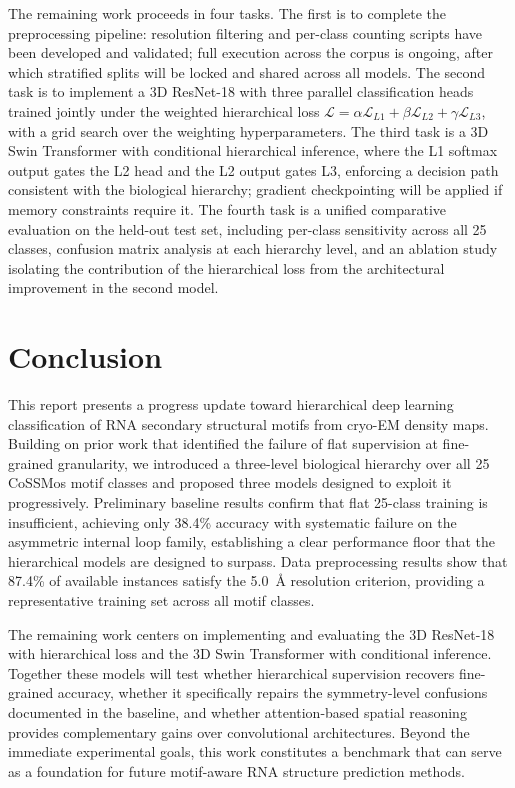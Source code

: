 \documentclass[sigconf]{acmart}
\begin{document}
The remaining work proceeds in four tasks. The first is to complete
the preprocessing pipeline: resolution filtering and per-class
counting scripts have been developed and validated; full execution
across the corpus is ongoing, after which stratified splits will
be locked and shared across all models. The second task is to
implement a 3D ResNet-18 with three parallel
classification heads trained jointly under the weighted hierarchical
loss $\mathcal{L} = \alpha\mathcal{L}_{L1} + \beta\mathcal{L}_{L2}
+ \gamma\mathcal{L}_{L3}$, with a grid search over the weighting
hyperparameters. The third task is a 3D Swin Transformer
\cite{swin2021} with conditional hierarchical inference, where the
L1 softmax output gates the L2 head and the L2 output gates L3,
enforcing a decision path consistent with the biological hierarchy;
gradient checkpointing will be applied if memory constraints
require it. The fourth task is a unified comparative evaluation
on the held-out test set, including per-class sensitivity across
all 25 classes, confusion matrix analysis at each hierarchy
level, and an ablation study isolating the contribution of the
hierarchical loss from the architectural improvement in the second model.

\section{Conclusion}

This report presents a progress update toward hierarchical deep
learning classification of RNA secondary structural motifs from
cryo-EM density maps. Building on prior work that identified the
failure of flat supervision at fine-grained granularity, we
introduced a three-level biological hierarchy over all 25 CoSSMos
motif classes and proposed three models designed to exploit it
progressively. Preliminary baseline results confirm that flat
25-class training is insufficient, achieving only 38.4\% accuracy
with systematic failure on the asymmetric internal loop family,
establishing a clear performance floor that the hierarchical
models are designed to surpass. Data preprocessing results show
that 87.4\% of available instances satisfy the 5.0~\AA{} resolution
criterion, providing a representative
training set across all motif classes.

The remaining work centers on implementing and evaluating the
3D ResNet-18 with hierarchical loss and the 3D Swin Transformer
with conditional inference. Together these models will test whether
hierarchical supervision recovers fine-grained accuracy, whether
it specifically repairs the symmetry-level confusions documented
in the baseline, and whether attention-based spatial reasoning
provides complementary gains over convolutional architectures.
Beyond the immediate experimental goals, this work constitutes
a
benchmark that can serve as a foundation for future motif-aware
RNA structure prediction methods.


\end{document}

